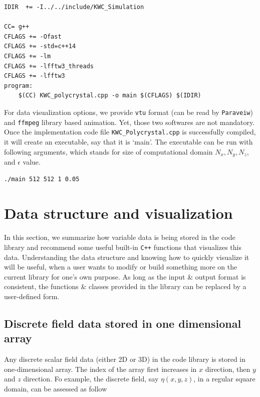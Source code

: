 \documentclass[11pt]{article}
\begin{document}
\begin{tcolorbox}[colback=white]
\begin{lstlisting}[basicstyle=\footnotesize]
IDIR  += -I../../include/KWC_Simulation

CC= g++
CFLAGS += -Ofast
CFLAGS += -std=c++14
CFLAGS += -lm
CFLAGS += -lfftw3_threads
CFLAGS += -lfftw3
program: 
	$(CC) KWC_polycrystal.cpp -o main $(CFLAGS) $(IDIR)
\end{lstlisting}
\end{tcolorbox}

For data visualization options, 
we provide \texttt{vtu} format (can be read by \texttt{Paraveiw}) 
and \texttt{ffmpeg} library based animation. 
Yet, those two softwares are not mandatory. \\

Once the implementation code file \texttt{KWC\_Polycrystal.cpp} 
is successfully compiled, it will create an executable, 
say that it is `main'. The executable can be run with following arguments, 
which stands for size of computational domain $N_x,N_y,N_z$, 
and $\epsilon$ value. 
 
\begin{tcolorbox}[colback=white]
\begin{lstlisting}[basicstyle=\footnotesize]
./main 512 512 1 0.05
\end{lstlisting}
\end{tcolorbox}

\section{Data structure and visualization}

In this section, we summarize how variable data is being stored in the code library 
and recommend some useful built-in \texttt{C++} functions that visualizes this data. 
Understanding the data structure and knowing how to quickly visualize it
will be useful, when a user wants to modify or build something more 
on the current library for one's own purpose. 
As long as the input \& output format is consistent,
the functions \& classes provided in the library 
can be replaced by a user-defined form.

\subsection{Discrete field data stored in one dimensional array}
Any discrete scalar field data (either 2D or 3D) in the code library is stored in one-dimensional array. 
The index of the array first increases in $x$ direction, then $y$ and $z$ direction. 
Fo example, the discrete field, say $\eta(x,y,z)$, in a regular square domain, 
can be assessed as follow
\end{document}
